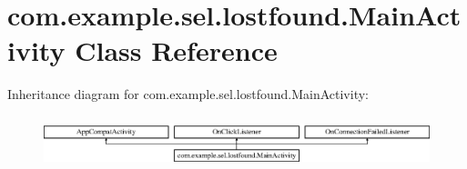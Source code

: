 \hypertarget{classcom_1_1example_1_1sel_1_1lostfound_1_1MainActivity}{}\section{com.\+example.\+sel.\+lostfound.\+Main\+Activity Class Reference}
\label{classcom_1_1example_1_1sel_1_1lostfound_1_1MainActivity}
Inheritance diagram for com.\+example.\+sel.\+lostfound.\+Main\+Activity\+:\begin{figure}[H]
\begin{center}
\leavevmode
\includegraphics[height=1.542700cm]{classcom_1_1example_1_1sel_1_1lostfound_1_1MainActivity}
\end{center}
\end{figure}
